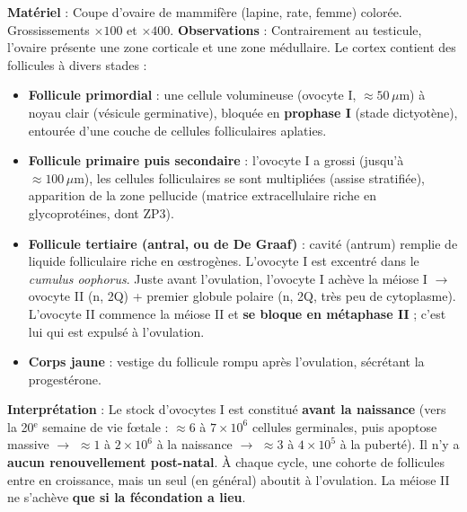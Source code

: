 \documentclass[11pt]{article}
\newcommand{\cle}[1]{{\popxbold\color{popdark}#1}}
\begin{document}
\begin{experience}
\textbf{Matériel} : Coupe d'ovaire de mammifère (lapine, rate, femme) colorée. Grossissements $\times 100$ et $\times 400$.
\textbf{Observations} : Contrairement au testicule, l'ovaire présente une zone corticale et une zone médullaire. Le cortex contient des \cle{follicules} à divers stades :
\begin{itemize}
    \item \textbf{Follicule primordial} : une cellule volumineuse (ovocyte I, $\approx 50\,\mu\text{m}$) à noyau clair (vésicule germinative), bloquée en \textbf{prophase I} (stade dictyotène), entourée d'une couche de cellules folliculaires aplaties.
    \item \textbf{Follicule primaire puis secondaire} : l'ovocyte I a grossi (jusqu'à $\approx 100\,\mu\text{m}$), les cellules folliculaires se sont multipliées (assise stratifiée), apparition de la \cle{zone pellucide} (matrice extracellulaire riche en glycoprotéines, dont ZP3).
    \item \textbf{Follicule tertiaire (antral, ou de De Graaf)} : cavité (antrum) remplie de liquide folliculaire riche en œstrogènes. L'ovocyte I est excentré dans le \emph{cumulus oophorus}. Juste avant l'ovulation, l'ovocyte I achève la méiose I $\rightarrow$ \cle{ovocyte II} (n, 2Q) + \cle{premier globule polaire} (n, 2Q, très peu de cytoplasme). L'ovocyte II commence la méiose II et \textbf{se bloque en métaphase II} ; c'est lui qui est expulsé à l'ovulation.
    \item \textbf{Corps jaune} : vestige du follicule rompu après l'ovulation, sécrétant la progestérone.
\end{itemize}
\textbf{Interprétation} : Le stock d'ovocytes I est constitué \textbf{avant la naissance} (vers la 20$^{\text{e}}$ semaine de vie fœtale : $\approx 6$ à $7 \times 10^{6}$ cellules germinales, puis apoptose massive $\rightarrow$ $\approx 1$ à $2 \times 10^{6}$ à la naissance $\rightarrow$ $\approx 3$ à $4 \times 10^{5}$ à la puberté). Il n'y a \textbf{aucun renouvellement post-natal}. À chaque cycle, une cohorte de follicules entre en croissance, mais un seul (en général) aboutit à l'ovulation. La méiose II ne s'achève \textbf{que si la fécondation a lieu}.
\end{experience}
\end{document}
